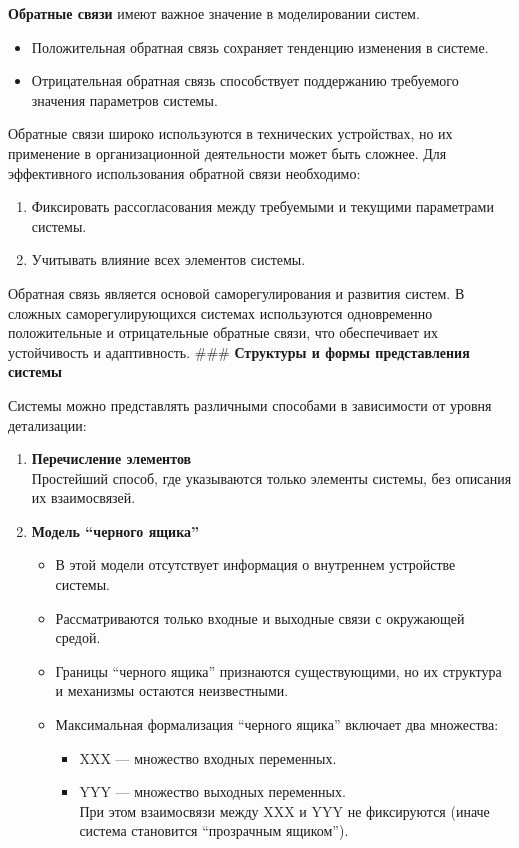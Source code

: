 \documentclass[
]{article}
\providecommand{\tightlist}{%
  \setlength{\itemsep}{0pt}\setlength{\parskip}{0pt}}
\begin{document}
\textbf{Обратные связи} имеют важное значение в моделировании систем.

\begin{itemize}
\tightlist
\item
  Положительная обратная связь сохраняет тенденцию изменения в системе.
\item
  Отрицательная обратная связь способствует поддержанию требуемого
  значения параметров системы.
\end{itemize}

Обратные связи широко используются в технических устройствах, но их
применение в организационной деятельности может быть сложнее. Для
эффективного использования обратной связи необходимо:

\begin{enumerate}
\def\labelenumi{\arabic{enumi}.}
\tightlist
\item
  Фиксировать рассогласования между требуемыми и текущими параметрами
  системы.
\item
  Учитывать влияние всех элементов системы.
\end{enumerate}

Обратная связь является основой саморегулирования и развития систем. В
сложных саморегулирующихся системах используются одновременно
положительные и отрицательные обратные связи, что обеспечивает их
устойчивость и адаптивность. \#\#\# \textbf{Структуры и формы
представления системы}

Системы можно представлять различными способами в зависимости от уровня
детализации:

\begin{enumerate}
\def\labelenumi{\arabic{enumi}.}
\item
  \textbf{Перечисление элементов}\\
  Простейший способ, где указываются только элементы системы, без
  описания их взаимосвязей.
\item
  \textbf{Модель ``черного ящика''}

  \begin{itemize}
  \tightlist
  \item
    В этой модели отсутствует информация о внутреннем устройстве
    системы.
  \item
    Рассматриваются только входные и выходные связи с окружающей средой.
  \item
    Границы ``черного ящика'' признаются существующими, но их структура
    и механизмы остаются неизвестными.
  \item
    Максимальная формализация ``черного ящика'' включает два множества:

    \begin{itemize}
    \tightlist
    \item
      XXX --- множество входных переменных.
    \item
      YYY --- множество выходных переменных.\\
      При этом взаимосвязи между XXX и YYY не фиксируются (иначе система
      становится ``прозрачным ящиком'').
    \end{itemize}
  \end{itemize}
\end{enumerate}
\end{document}
